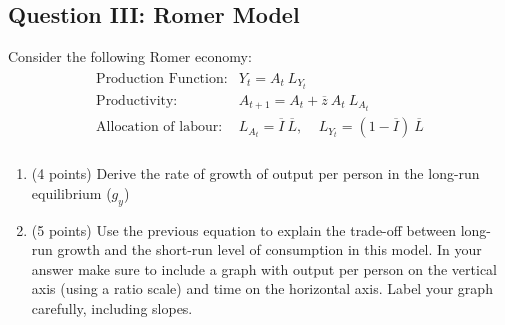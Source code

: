 \documentclass[letterpaper,12pt]{article}
\theoremstyle{dotlessS}
\begin{document}
\subsection*{Question III: Romer Model}
Consider the following Romer economy: 
\begin{eqnarray*}
\begin{array}{ll}
\text{Production Function:} & Y_t=A_t  \: L_{Y_t} \\[1.4ex]
\text{Productivity:} & A_{t+1}=A_t+\overline{z} \: A_t \: L_{A_{t}}  \\[1.4ex]
\text{Allocation of labour:} & L_{A_{t}}=\overline{I} \: \overline{L}, \: \: \:  \: \: L_{Y_{t}}=(1-\overline{I}) \: \overline{L}  \\[1.4ex]
\end{array}
\end{eqnarray*}
\begin{enumerate}[label=(\alph*)]
\item (4 points) Derive the rate of growth of output per person in the long-run equilibrium ($g_y$)
\item (5 points) Use the previous equation to explain the trade-off between long-run growth and the short-run level of consumption in this model. In your answer make sure to include a graph with output per person on the vertical axis (using a ratio scale) and time on the horizontal axis. Label your graph carefully, including slopes.
\end{enumerate} 
\end{document}
